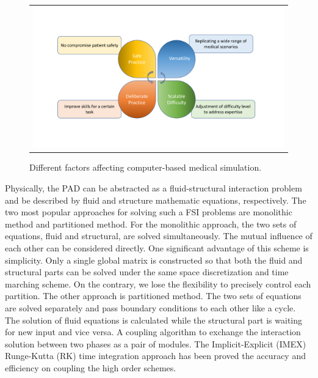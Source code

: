 \begin{figure}[H]
	\centering
	\begin{tabular}{c}
		\includegraphics[width=1.0\textwidth]{./pics/computer_simulation}
	\end{tabular}
	\caption{\footnotesize Different factors affecting computer-based medical simulation.} \label{fig: ch1f1}
\end{figure}

Physically, the PAD can be abstracted as a fluid-structural interaction problem and be described by fluid and structure mathematic equations, respectively.  The two most popular approaches for solving such a FSI problems are monolithic method and partitioned method. For the monolithic approach, the two sets of equations, fluid and structural, are solved simultaneously. The mutual influence of each other can be considered directly. One significant advantage of this scheme is simplicity. Only a single global matrix is constructed so that both the fluid and structural parts can be solved under the same space discretization and time marching scheme. On the contrary, we lose the flexibility to precisely control each partition. The other approach is partitioned method. The two sets of equations are solved separately and pass boundary conditions to each other like a cycle. The solution of fluid equations is calculated while the structural part is waiting for new input and vice versa. A coupling algorithm to exchange the interaction solution between two phases as a pair of modules. The Implicit-Explicit (IMEX) Runge-Kutta (RK) time integration approach has been proved the accuracy and efficiency on coupling the high order schemes\cite{zhang2016high}.

